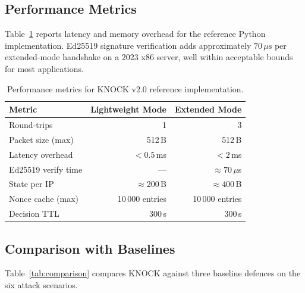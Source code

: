 \documentclass[10pt,conference]{IEEEtran}
\begin{document}
\subsection{Performance Metrics}

Table~\ref{tab:perf} reports latency and memory overhead for the
reference Python implementation.  Ed25519 signature verification
adds approximately $70\,\mu\mathrm{s}$ per extended-mode handshake
on a 2023 x86 server, well within acceptable bounds for most
applications.

\begin{table}[h]
  \centering
  \caption{Performance metrics for KNOCK v2.0 reference implementation.}
  \label{tab:perf}
  \footnotesize
  \begin{tabular}{@{}lrr@{}}
    \toprule
    \textbf{Metric} & \textbf{Lightweight Mode} & \textbf{Extended Mode} \\
    \midrule
    Round-trips          & 1          & 3 \\
    Packet size (max)    & 512\,B     & 512\,B \\
    Latency overhead     & $< 0.5$\,ms & $< 2$\,ms \\
    Ed25519 verify time  & ---        & $\approx 70\,\mu$s \\
    State per IP         & $\approx 200$\,B & $\approx 400$\,B \\
    Nonce cache (max)    & 10\,000 entries & 10\,000 entries \\
    Decision TTL         & 300\,s     & 300\,s \\
    \bottomrule
  \end{tabular}
\end{table}

\subsection{Comparison with Baselines}

Table~\ref{tab:comparison} compares KNOCK against three baseline
defences on the six attack scenarios.
\end{document}
